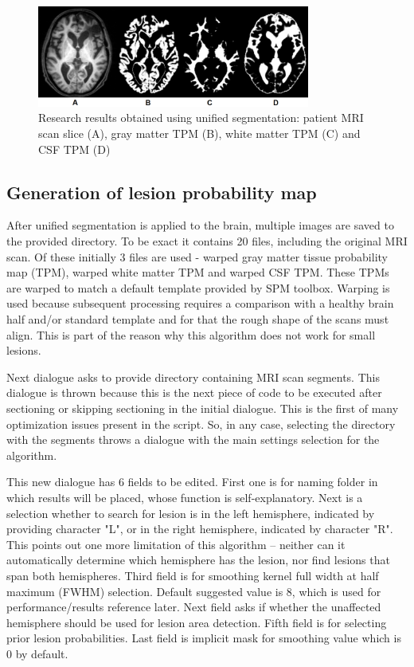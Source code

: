 \documentclass[12pt]{article}
\begin{document}
\begin{figure}[!htb]
\centering
\includegraphics[width=0.8\textwidth]{img/segm}
\caption{Research results obtained using unified segmentation: patient MRI scan slice (A), gray matter TPM (B), white matter TPM (C) and CSF TPM (D)}
\label{fig:segm}
\end{figure}

\subsection{Generation of lesion probability map}
\label{ssec:lesionGen}

After unified segmentation is applied to the brain, multiple images are saved to the provided directory. To be exact it contains 20 files, including the original MRI scan. Of these initially 3 files are used - warped gray matter tissue probability map (TPM), warped white matter TPM and warped CSF TPM. These TPMs are warped to match a default template provided by SPM toolbox. Warping is used because subsequent processing requires a comparison with a healthy brain half and/or standard template and for that the rough shape of the scans must align. This is part of the reason why this algorithm does not work for small lesions.

Next dialogue asks to provide directory containing MRI scan segments. This dialogue is thrown because this is the next piece of code to be executed after sectioning or skipping sectioning in the initial dialogue. This is the first of many optimization issues present in the script. So, in any case, selecting the directory with the segments throws a dialogue with the main settings selection for the algorithm.

This new dialogue has 6 fields to be edited. First one is for naming folder in which results will be placed, whose function is self-explanatory. Next is a selection whether to search for lesion is in the left hemisphere, indicated by providing character "L", or in the right hemisphere, indicated by character "R". This points out one more limitation of this algorithm – neither can it automatically determine which hemisphere has the lesion, nor find lesions that span both hemispheres. Third field is for smoothing kernel full width at half maximum (FWHM) selection. Default suggested value is 8, which is used for performance/results reference later. Next field asks if whether the unaffected hemisphere should be used for lesion area detection. Fifth field is for selecting prior lesion probabilities. Last field is implicit mask for smoothing value which is 0 by default.
\end{document}
